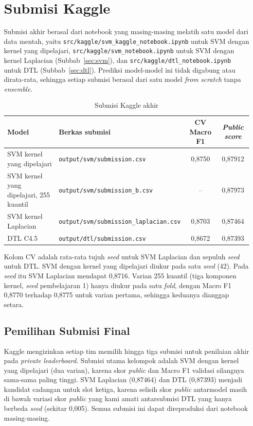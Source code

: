 \section{Submisi Kaggle}
\label{sec:kaggle}

Submisi akhir berasal dari notebook yang masing-masing melatih satu model dari data mentah, yaitu
\nolinkurl{src/kaggle/svm_kaggle_notebook.ipynb} untuk SVM dengan kernel yang dipelajari,
\nolinkurl{src/kaggle/svm_notebook.ipynb} untuk SVM dengan kernel Laplacian (Subbab~\ref{sec:svm}),
dan \nolinkurl{src/kaggle/dtl_notebook.ipynb} untuk DTL (Subbab~\ref{sec:dtl}). Prediksi model-model ini
tidak digabung atau dirata-rata, sehingga setiap submisi berasal dari satu model \textit{from scratch}
tanpa \textit{ensemble}.

\begin{table}[H]
	\centering
	\caption{Submisi Kaggle akhir}
	\label{tab:kaggle-final}
	\begin{tabularx}{\textwidth}{l Y c c}
		\toprule
		\textbf{Model} & \textbf{Berkas submisi} & \textbf{CV Macro F1} & \textbf{\textit{Public score}} \\
		\midrule
		SVM kernel yang dipelajari & \texttt{output/svm/submission.csv} & 0,8750 & 0,87912 \\
		SVM kernel yang dipelajari, 255 kuantil & \texttt{output/svm/submission\_b.csv} & -- & 0,87973 \\
		SVM kernel Laplacian & \texttt{output/svm/submission\_laplacian.csv} & 0,8703 & 0,87464 \\
		DTL C4.5 & \texttt{output/dtl/submission.csv} & 0,8672 & 0,87393 \\
		\bottomrule
	\end{tabularx}
\end{table}

Kolom CV adalah rata-rata tujuh \textit{seed} untuk SVM Laplacian dan sepuluh \textit{seed} untuk DTL. SVM dengan
kernel yang dipelajari diukur pada satu \textit{seed} (42). Pada \textit{seed} itu SVM Laplacian mendapat 0,8716.
Varian 255 kuantil (tiga komponen kernel, \textit{seed} pembelajaran 1) hanya diukur pada satu \textit{fold}, dengan Macro F1 0,8770
terhadap 0,8775 untuk varian pertama, sehingga keduanya dianggap setara.

\subsection{Pemilihan Submisi Final}

Kaggle mengizinkan setiap tim memilih hingga tiga submisi untuk penilaian akhir pada
\textit{private leaderboard}. Submisi utama kelompok adalah SVM dengan kernel yang dipelajari (dua varian), karena
skor \textit{public} dan Macro F1 validasi silangnya sama-sama paling tinggi. SVM Laplacian (0,87464)
dan DTL (0,87393) menjadi kandidat cadangan untuk slot ketiga, karena selisih skor \textit{public} antarmodel masih di bawah
variasi skor \textit{public} yang kami amati antarsubmisi DTL yang hanya berbeda
\textit{seed} (sekitar 0,005). Semua submisi ini dapat direproduksi dari notebook masing-masing.

